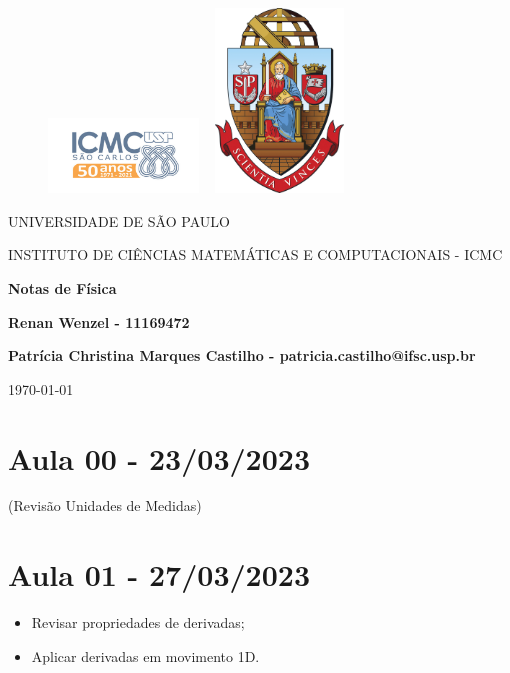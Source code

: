 \documentclass{article}
\begin{document}
\begin{figure}[ht]
  \includegraphics[width=4cm]{icmc.png}
  \hspace{7cm}
  \includegraphics[height=4.9cm,width=4cm]{brasao_usp_cor.jpg}
\endminipage  
\end{figure}

\begin{center}
\vspace{1cm}
\LARGE
UNIVERSIDADE DE S\~AO PAULO

\vspace{1.3cm}
\LARGE
INSTITUTO DE CI\^ENCIAS MATEM\'ATICAS E COMPUTACIONAIS - ICMC

\vspace{1.7cm}
\Large
\textbf{Notas de F\'isica}

\vspace{1.3cm}
\large
\textbf{Renan Wenzel - 11169472}

\vspace{1.3cm}
\large
\textbf{Patr\'icia Christina Marques Castilho - patricia.castilho@ifsc.usp.br}

\vspace{1.3cm}
\today
\end{center}

\newpage

\tableofcontents

\newpage

\section{Aula 00 - 23/03/2023}
  (Revis\~ao Unidades de Medidas)

\section{Aula 01 - 27/03/2023}
\begin{itemize}
  \item Revisar propriedades de derivadas;
  \item Aplicar derivadas em movimento 1D. 
\end{itemize}
\end{document}
